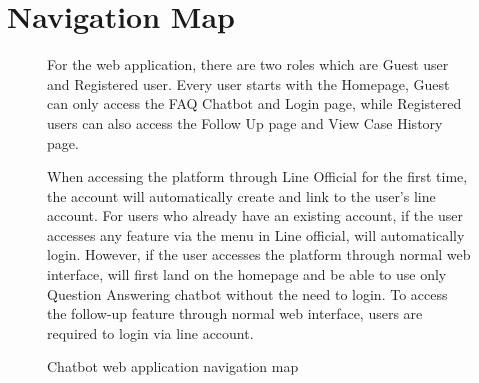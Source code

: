 \documentclass[12pt,oneside,openright,a4paper]{cpe-english-project}
\begin{document}
  \section{Navigation Map}
    \begin{figure}[!h]
      \centering
      \caption{Chatbot web application navigation map}\label{fig:Navigation_Map}
      \begin{flushleft}
        \qquad For the web application, there are two roles which are Guest user and Registered user. Every user starts with the Homepage, Guest can only access the FAQ Chatbot and Login page, while Registered users can also access the Follow Up page and View Case History page. \par
        \qquad When accessing the platform through Line Official for the first time, the account will automatically create and link to the user’s line account. For users who already have an existing account, if the user accesses any feature via the menu in Line official, will automatically login. However, if the user accesses the platform through normal web interface, will first land on the homepage and be able to use only Question Answering chatbot without the need to login. To access the follow-up feature through normal web interface, users are required to login via line account. \par
      \end{flushleft}
    \end{figure}
\end{document}
